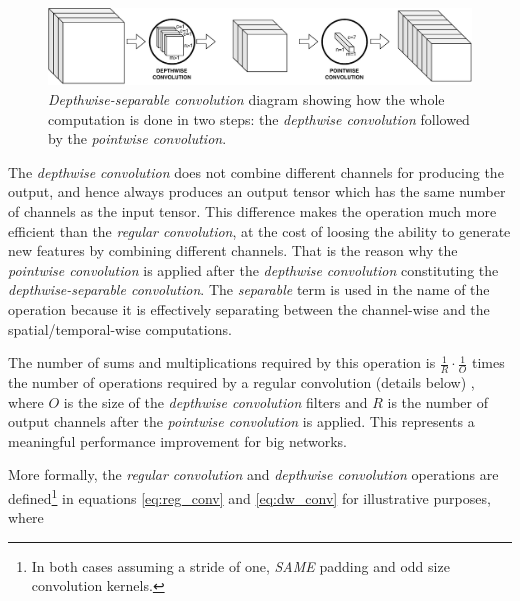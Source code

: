 \begin{figure}[ht]
	\centering
	\includegraphics[width=1\linewidth]{kws/images/dws_conv_new}
	\caption[\textit{Depthwise-separable convolution} diagram]{\textit{Depthwise-separable convolution} diagram showing how the whole computation is done in two steps: the \textit{depthwise convolution} followed by the \textit{pointwise convolution}.}
	\label{fig:dwsconv}
\end{figure}



The \textit{depthwise convolution} does not combine different channels for producing the output, and hence always produces an output tensor which has the same number of channels as the input tensor. This difference makes the operation much more efficient than the \textit{regular convolution}, at the cost of loosing the ability to generate new features by combining different channels. That is the reason why the \textit{pointwise convolution} is applied after the \textit{depthwise convolution} constituting the \textit{depthwise-separable convolution}. The \textit{separable} term is used in the name of the operation because it is effectively separating between the channel-wise and the spatial/temporal-wise computations. 

The number of sums and multiplications required by this operation is $\frac{1}{R} \cdot \frac{1}{O}$ times the number of operations required by a regular convolution (details below)  \autocite{howard2017}, where $O$ is the size of the \textit{depthwise convolution} filters and $R$ is the number of output channels after the \textit{pointwise convolution} is applied. This represents a meaningful performance improvement for big networks.

More formally, the \textit{regular convolution} and \textit{depthwise convolution} operations \autocite{howard2017}  are defined\footnote{In both cases assuming a stride of one, \textit{SAME} padding and odd size convolution kernels.} in equations \ref{eq:reg_conv} and  \ref{eq:dw_conv} for illustrative purposes, where

